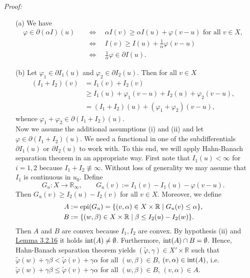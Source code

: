 \textit{Proof:}
\begin{itemize}
	\item[(a)] We have
	\begin{align*}
		\varphi\in\partial(\alpha I)(u)\quad&\Longleftrightarrow\quad\alpha I(v)\geq\alpha I(u)+\varphi(v-u)\text{ for all }v\in X,\\
		&\Longleftrightarrow\quad I(v)\geq I(u)+\frac{1}{\alpha}\varphi(v-u)\\
		&\Longleftrightarrow\quad\frac{1}{\alpha}\varphi\in\partial I(u).
	\end{align*}
	\item[(b)] Let $\varphi_1\in\partial I_1(u)$ and $\varphi_2\in\partial I_2(u)$. Then for all $v\in X$
	\begin{align*}
		(I_1+I_2)(v)&=I_1(v)+I_2(v)\\
		&\geq I_1(u)+\varphi_1(v-u)+I_2(u)+\varphi_2(v-u),\\
		&=(I_1+I_2)(u)+(\varphi_1+\varphi_2)(v-u),
	\end{align*}
	whence $\varphi_1+\varphi_2\in\partial(I_1+I_2)(u)$.\\

	Now we assume the additional assumptions (i) and (ii) and let $\varphi\in\partial(I_1+I_2)(u)$. We need a functional in one of the subdifferentials $\partial I_1(u)$ or $\partial I_2(u)$ to work with. To this end, we will apply Hahn-Banach separation theorem in an appropriate way. First note that $I_1(u)<\infty$ for $i=1,2$ because $I_1+I_2\not\equiv\infty$. Without loss of generality we may assume that $I_1$ is continuous in $u_0$. Define
	\[G_u:X\longrightarrow\mathbb{R}_\infty,\qquad G_u(v):=I_1(v)-I_1(u)-\varphi(v-u).\]
	Then $G_u(v)\geq I_2(u)-I_2(v)$ for all $v\in X$. Moreover, we define
	\begin{align*}
		A&:=\operatorname{epi}\mathopen{}\left(G_u\right)\mathclose{}=\{(v,\alpha)\in X\times\mathbb{R}\mid G_u(v)\leq\alpha\},\\
		B&:=\{(w,\beta)\in X\times\mathbb{R}\mid\beta\leq I_2(u)-I_2(w)\}.
	\end{align*}
	Then $A$ and $B$ are convex because $I_1,I_2$ are convex. By hypothesis (ii) and \hyperlink{lemma_3_2_16}{Lemma 3.2.16} it holds $\operatorname{int}\mathopen{}\left(A\right)\mathclose{}\ne\emptyset$. Furthermore, $\operatorname{int}\mathopen{}\left(A\right)\mathclose{}\cap B=\emptyset$. Hence, Hahn-Banach separation theorem yields $(\tilde{\varphi},\gamma)\in X'\times\mathbb{R}$ such that $\tilde{\varphi}(w)+\gamma\beta<\tilde{\varphi}(v)+\gamma\alpha$ for all $(w,\beta)\in B$, $(v,\alpha)\in\operatorname{int}\mathopen{}\left(A\right)\mathclose{}$, i.e. $\tilde{\varphi}(w)+\gamma\beta\leq\tilde{\varphi}(v)+\gamma\alpha$ for all $(w,\beta)\in B$, $(v,\alpha)\in A$.\\


\end{itemize}
